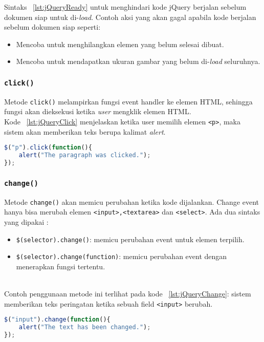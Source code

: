 \noindent Sintaks ~\ref{lst:jQueryReady} untuk menghindari kode jQuery berjalan sebelum dokumen siap untuk di-\textit{load}. Contoh aksi yang akan gagal apabila kode berjalan sebelum dokumen siap seperti:
\begin{itemize}
	\item Mencoba untuk menghilangkan elemen yang belum selesai dibuat.
	\item Mencoba untuk mendapatkan ukuran gambar yang belum di-\textit{load} seluruhnya.
\end{itemize}


\subsubsection{\texttt{click()}}
Metode \texttt{click()} melampirkan fungsi event handler ke elemen HTML, sehingga fungsi akan dieksekusi ketika \textit{user} mengklik elemen HTML.\\

\noindent Kode ~\ref{lst:jQueryClick} menjelaskan ketika user memilih elemen \texttt{<p>}, maka sistem akan memberikan teks berupa kalimat \textit{alert}.
\begin{lstlisting}[style=JavaScript, language=JavaScript,  basicstyle=\ttfamily, frame=single, columns=fullflexible, keepspaces=true, breaklines=true, showstringspaces=false, label={lst:jQueryClick}, caption=jQuery click().]
$("p").click(function(){
	alert("The paragraph was clicked.");
});

\end{lstlisting}

\subsubsection{\texttt{change()}}
Metode \texttt{change()} akan memicu perubahan ketika kode dijalankan. Change event hanya bisa merubah elemen \texttt{<input>,<textarea>} dan \texttt{<select>}.
Ada dua sintaks yang dipakai :
\begin{itemize}
	\item \texttt{\$(selector).change()}: memicu perubahan event untuk elemen terpilih.
	\item \texttt{\$(selector).change(function)}: memicu perubahan event dengan menerapkan fungsi tertentu.
\end{itemize}
\\ \noindent
Contoh penggunaan metode ini terlihat pada kode ~\ref{lst:jQueryChange}: sistem memberikan teks peringatan ketika sebuah field \texttt{<input>} berubah.
\begin{lstlisting}[style=JavaScript, language=JavaScript,  basicstyle=\ttfamily, frame=single, columns=fullflexible, keepspaces=true, breaklines=true, showstringspaces=false, label={lst:jQueryChange}, caption=jQuery change().]
$("input").change(function(){
	alert("The text has been changed.");
});
\end{lstlisting}

